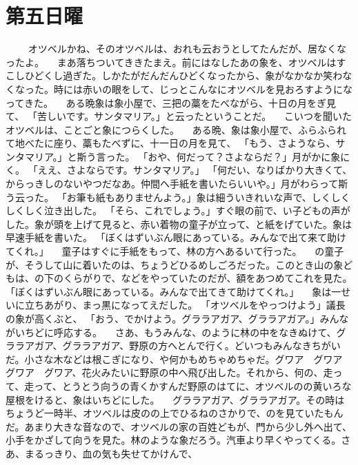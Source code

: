 \section*{第五日曜}
　
　オツベルかね、そのオツベルは、おれも云おうとしてたんだが、居なくなったよ。
　まあ落ちついてききたまえ。前にはなしたあの象を、オツベルはすこしひどくし過ぎた。しかたがだんだんひどくなったから、象がなかなか笑わなくなった。時には赤いの眼をして、じっとこんなにオツベルを見おろすようになってきた。
　ある晩象は象小屋で、三把の藁をたべながら、十日の月をぎ見て、
「苦しいです。サンタマリア。」と云ったということだ。
　こいつを聞いたオツベルは、ことごと象につらくした。
　ある晩、象は象小屋で、ふらふられて地べたに座り、藁もたべずに、十一日の月を見て、
「もう、さようなら、サンタマリア。」と斯う言った。
「おや、何だって？{}さよならだ？」月がかに象にく。
「ええ、さよならです。サンタマリア。」
「何だい、なりばかり大きくて、からっきしのないやつだなあ。仲間へ手紙を書いたらいいや。」月がわらって斯う云った。
「お筆も紙もありませんよう。」象は細ういきれいな声で、しくしくしくしく泣き出した。
「そら、これでしょう。」すぐ眼の前で、い子どもの声がした。象が頭を上げて見ると、赤い着物の童子が立って、と紙をげていた。象は早速手紙を書いた。
「ぼくはずいぶん眼にあっている。みんなで出て来て助けてくれ。」
　童子はすぐに手紙をもって、林の方へあるいて行った。
　の童子が、そうして山に着いたのは、ちょうどひるめしごろだった。このとき山の象どもは、の下のくらがりで、などをやっていたのだが、額をあつめてこれを見た。
「ぼくはずいぶん眼にあっている。みんなで出てきて助けてくれ。」
　象は一せいに立ちあがり、まっ黒になってえだした。
「オツベルをやっつけよう」議長の象が高くぶと、
「おう、でかけよう。グララアガア、グララアガア。」みんながいちどに呼応する。
　さあ、もうみんな、のように林の中をなきぬけて、グララアガア、グララアガア、野原の方へとんで行く。どいつもみんなきちがいだ。小さな木などは根こぎになり、や何かもめちゃめちゃだ。グワア　グワア　グワア　グワア、花火みたいに野原の中へ飛び出した。それから、何の、走って、走って、とうとう向うの青くかすんだ野原のはてに、オツベルのの黄いろな屋根をけると、象はいちどにした。
　グララアガア、グララアガア。その時はちょうど一時半、オツベルは皮のの上でひるねのさかりで、のを見ていたもんだ。あまり大きな音なので、オツベルの家の百姓どもが、門から少し外へ出て、小手をかざして向うを見た。林のような象だろう。汽車より早くやってくる。さあ、まるっきり、血の気も失せてかけんで、
